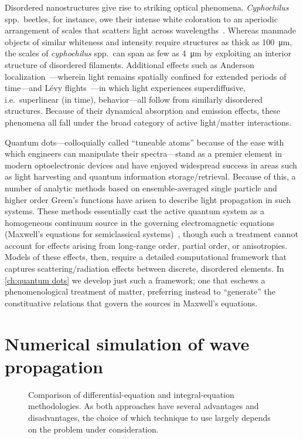 Disordered nanostructures give rise to striking optical phenomena.
\emph{Cyphochilus} spp.\ beetles, for instance, owe their intense white coloration to an aperiodic arrangement of scales that scatters light across wavelengths~\cite{Vukusic2007}.
Whereas manmade objects of similar whiteness and intensity require structures as thick as \SI{100}{\micro\meter}, the scales of \emph{cyphochilus} spp.\ can span as few as \SI{4}{\micro\meter} by exploiting an interior structure of disordered filaments.
Additional effects such as Anderson localization~\cite{Anderson1985}---wherein light remains spatially confined for extended periods of time---and L\'evy flights~\cite{Barthelemy2008}---in which light experiences superdiffusive, i.e.\ superlinear (in time), behavior---all follow from similarly disordered structures.
Because of their dynamical absorption and emission effects, these phenomena all fall under the broad category of active light/matter interactions.

Quantum dots---colloquially called ``tuneable atoms'' because of the ease with which engineers can manipulate their spectra---stand as a premier element in modern optoelectronic devices and have enjoyed widespread success in areas such as light harvesting and quantum information storage/retrieval.
Because of this, a number of analytic methods based on ensemble-averaged single particle and higher order Green's functions have arisen to describe light propagation in such systems.
These methods essentially cast the active quantum system as a homogeneous continuum source in the governing electromagnetic equations (Maxwell's equations for semiclassical systems)~\cite{Arecchi1965}, though such a treatment cannot account for effects arising from long-range order, partial order, or anisotropies.
Models of these effects, then, require a detailed computational framework that captures scattering/radiation effects between discrete, disordered elements.
In \cref{ch:quantum dots} we develop just such a framework; one that eschews a phenomenological treatment of matter, preferring instead to ``generate'' the constituative relations that govern the sources in Maxwell's equations.

\section{Numerical simulation of wave propagation}

\begin{figure}
  \centering
  
  \caption{\label{fig:mindmap} Comparison of differential-equation and integral-equation methodologies.
    As both approaches have several advantages and disadvantages, the choice of which technique to use largely depends on the problem under consideration.
  }
\end{figure}

